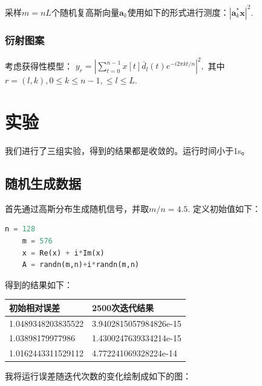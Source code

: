 \documentclass[12pt,letterpaper]{article}
\begin{document}
采样$m=nL$个随机复高斯向量$\mathbf{a}_k$使用如下的形式进行测度：$|\mathbf{a}_k^*\mathbf{x}|^2.$

\subsubsection*{衍射图案}

考虑获得性模型：
$y_r = \left| \sum_{t = 0}^{n-1} x[t] \bar{d}_l(t) e^{-i2\pi k t/n}   \right|^2,$ 其中$r = (l, k),0 \le k \le n-1, \le l \le L .$

\section*{实验}

我们进行了三组实验，得到的结果都是收敛的。运行时间小于1s。

\subsection*{随机生成数据}

首先通过高斯分布生成随机信号，并取$m/n=4.5.$ 定义初始值如下：

\begin{lstlisting}[language={python}]
    n = 128
    m = 576
    x = Re(x) + i*Im(x)
    A = randn(m,n)+i*randn(m,n)
\end{lstlisting}

得到的结果如下：

\begin{table}[h]
\centering
\begin{tabular}{|l|l|}
\hline
 初始相对误差 & 2500次迭代结果\\ \hline
 1.0489348203835522& 3.9402815057984826e-15 \\ \hline
 1.03898179977986 & 1.4300247639334214e-15 \\ \hline
 1.0162443311529112 &4.772241069328224e-14 \\ \hline
\end{tabular}
\end{table}

我将运行误差随迭代次数的变化绘制成如下的图：
\end{document}
